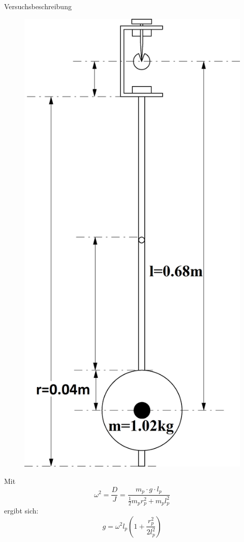 \documentclass[11pt]{beamer}
\begin{document}
\begin{frame}{Versuchsbeschreibung}
\begin{multicols}{2}
\begin{figure}[H]
\centering
\includegraphics[scale=0.08]{Bilder/skizze_pendel_bearbeitet.png}
\end{figure}
\columnbreak
Mit
\begin{equation*}
\omega^2=\frac{D}{J}=\frac{m_p \cdot g \cdot l_p}{\frac{1}{2}m_p r_p^2+m_pl_p^2}
\end{equation*}
ergibt sich:
\begin{equation*}
g=\omega^2 l_p (1+\frac{r_p^2}{2 l_p^2}) 
\label{g}
\end{equation*} 
\end{multicols}
\end{frame}
\end{document}
